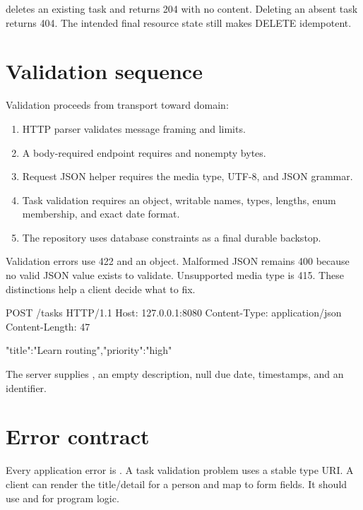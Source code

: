  deletes an existing task and returns 204 with no
content. Deleting an absent task returns 404. The intended final resource state
still makes DELETE idempotent.

\section{Validation sequence}

Validation proceeds from transport toward domain:

\begin{enumerate}
  \item HTTP parser validates message framing and limits.
  \item A body-required endpoint requires  and nonempty bytes.
  \item Request JSON helper requires the media type, UTF-8, and JSON grammar.
  \item Task validation requires an object, writable names, types, lengths,
        enum membership, and exact date format.
  \item The repository uses database constraints as a final durable backstop.
\end{enumerate}

Validation errors use 422 and an  object. Malformed JSON remains
400 because no valid JSON value exists to validate. Unsupported media type is
415. These distinctions help a client decide what to fix.

\begin{wireview}
\begin{wiremessage}
POST /tasks HTTP/1.1
Host: 127.0.0.1:8080
Content-Type: application/json
Content-Length: 47

{"title":"Learn routing","priority":"high"}
\end{wiremessage}
The server supplies , an empty description, null due date,
timestamps, and an identifier.
\end{wireview}

\section{Error contract}

Every application error is . A task validation
problem uses a stable type URI. A client can render the title/detail for a person
and map  to form fields. It should use  and 
for program logic.

